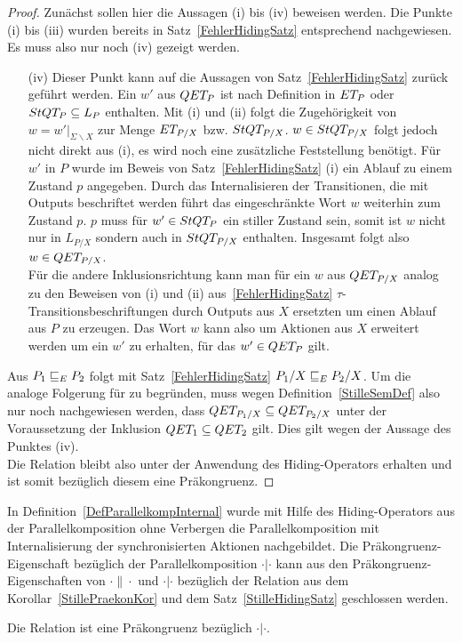 \begin{proof}
  Zunächst sollen hier die Aussagen (i) bis (iv) beweisen werden. Die Punkte
  (i) bis (iii) wurden bereits in Satz~\ref{FehlerHidingSatz} entsprechend
  nachgewiesen. Es muss also nur noch (iv) gezeigt werden.
  \begin{itemize}
    \item[(iv)] Dieser Punkt kann auf die Aussagen von
      Satz~\ref{FehlerHidingSatz} zurück geführt werden. Ein $w'$ aus $QET _P$
      ist nach Definition in $ET _P$ oder $StQT _P \subseteq L_P$ enthalten.
      Mit (i) und (ii) folgt die Zugehörigkeit von $w=w'|_{\Sigma\backslash X}$
      zur Menge $ET _{P/X}$ bzw. $StQT _{P/X}$. $w\in StQT _{P/X}$ folgt
      jedoch nicht direkt aus (i), es wird noch eine zusätzliche Feststellung
      benötigt. Für $w'$ in $P$ wurde im Beweis von Satz~\ref{FehlerHidingSatz}
      (i) ein Ablauf zu einem Zustand $p$ angegeben. Durch das Internalisieren
      der Transitionen, die mit Outputs beschriftet werden führt das
      eingeschränkte Wort $w$ weiterhin zum Zustand $p$. $p$ muss für
      $w'\in StQT _P$ ein stiller Zustand sein, somit ist $w$ nicht nur in $L
      _{P/X}$ sondern auch in $StQT _{P/X}$ enthalten. Insgesamt folgt also
      $w\in QET _{P/X}$.\\
      Für die andere Inklusionsrichtung kann man für ein $w$ aus $QET _{P/X}$
      analog zu den Beweisen von (i) und (ii) aus~\ref{FehlerHidingSatz}
      $\tau$-Transitionsbeschriftungen durch Outputs aus $X$ ersetzten um einen
      Ablauf aus $P$ zu erzeugen. Das Wort $w$ kann also um Aktionen aus $X$
      erweitert werden um ein $w'$ zu erhalten, für das $w'\in QET _P$ gilt.
  \end{itemize}
  Aus $P_1 \sqsubseteq  _E P_2$ folgt mit Satz~\ref{FehlerHidingSatz} $P_1/X \sqsubseteq  _E P_2/X$.
  Um die analoge Folgerung für \QRel{} zu begründen, muss wegen
  Definition~\ref{StilleSemDef} also nur noch nachgewiesen werden, dass $QET
  _{P_1/X} \subseteq QET _{P_2/X}$ unter der Voraussetzung der Inklusion $QET
  _1 \subseteq QET _2$ gilt. Dies gilt wegen der Aussage des Punktes (iv).\\
  Die Relation \QRel{} bleibt also unter der Anwendung des Hiding-Operators
  erhalten und ist somit bezüglich diesem eine Präkongruenz.
\end{proof}

In Definition~\ref{DefParallelkompInternal} wurde mit Hilfe des
Hiding-Operators aus der Parallelkomposition ohne Verbergen die
Parallelkomposition mit Internalisierung der synchronisierten Aktionen
nachgebildet. Die Präkongruenz-Eigenschaft bezüglich \QRel{} der
Parallelkomposition $\cdot |\cdot$ kann aus den Präkongruenz-Eigenschaften von
$\cdot\|\cdot$ und $\cdot |\cdot$ bezüglich der Relation \QRel{} aus dem
Korollar~\ref{StillePraekonKor} und dem Satz~\ref{StilleHidingSatz} geschlossen
werden.

\begin{Kor}
  Die Relation \QRel{} ist eine Präkongruenz bezüglich $\cdot |\cdot$.
\end{Kor}
